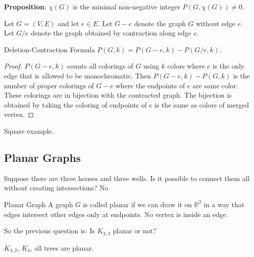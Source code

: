 \documentclass{report}
\begin{document}
\textbf{Proposition}: $ \chi (G)$ is the minimal non-negative integer $P(G, \chi (G)) \neq 0$.

Let $G = (V, E)$ and let $e \in E$. Let $G - e$ denote the graph $G$ without edge $e$. Let $G/e$ denote the graph obtained by contraction along edge $e$.

\begin{theorem}{Deletion-Contraction Formula}
    $P(G, k) = P(G - e, k) - P(G/e, k)$. 
\end{theorem}
    \begin{proof}
        $P(G - e, k)$ counts all colorings of $G$ using $k$ colors where $e$ is the only edge that is allowed to be monochromatic. Then $P(G - e, k) - P(G, k)$ is the number of proper colorings of $G - e$ where the endpoints of $e$ are same color. These colorings are in bijection with the contracted graph. The bijection is obtained by taking the coloring of endpoints of $e$ is the same as colors of merged vertex.
    \end{proof}

\begin{examples}
    \begin{example}
        Square example.
    \end{example}
\end{examples}

\begin{topic}
    \section{Planar Graphs}
\end{topic}

Suppose there are three houses and three wells. Is it possible to connect them all without creating intersections? No

\begin{definition}{Planar Graph}
    A graph $G$ is called planar if we can draw it on $\mathbb{R}^{2}$ in a way that edges intersect other edges only at endpoints. No vertex is inside an edge.
\end{definition}

So the previous question is: Is $K_{3, 3}$ planar or not?

\begin{examples}
    \begin{example}
        $K_{3, 2}$, $K_{4}$, all trees are planar.
    \end{example}
\end{examples}
\end{document}
